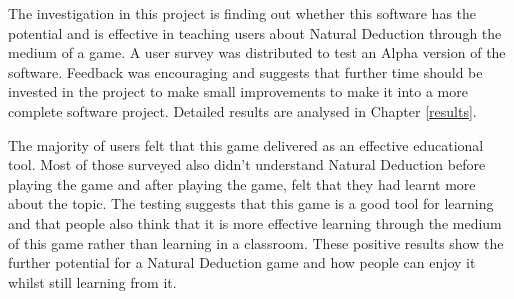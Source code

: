 \documentclass[FYP.tex]{subfiles}
\begin{document}

The investigation in this project is finding out whether this software has the potential and is effective in teaching users about Natural Deduction through the medium of a game. A user survey was distributed to test an Alpha version of the software. Feedback was encouraging and suggests that further time should be invested in the project to make small improvements to make it into a more complete software project. Detailed results are analysed in Chapter \ref{results}.  

The majority of users felt that this game delivered as an effective educational tool. Most of those surveyed also didn't understand Natural Deduction before playing the game and after playing the game, felt that they had learnt more about the topic. The testing suggests that this game is a good tool for learning and that people also think that it is more effective learning through the medium of this game rather than learning in a classroom. These positive results show the further potential for a Natural Deduction game and how people can enjoy it whilst still learning from it.  


\end{document}
